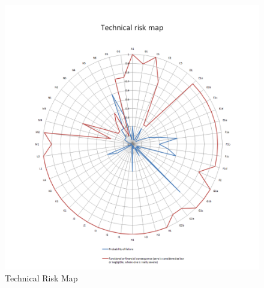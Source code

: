 \begin{enumerate}[A]
\begin{figure} [h]
	\begin{center}
 \includegraphics[trim = 0mm 0mm 0mm 35mm, clip,width=1.0\textwidth,angle=0]{chapters/img/TRA_RM.png}	
	\caption{Technical Risk Map}
	\label{TRA_RM}
	\end{center}
\end{figure}

\end{enumerate}